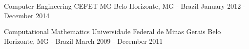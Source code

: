 

\begin{cventries}

  \cventry
    {Computer Engineering} %
    {CEFET MG} %
    {Belo Horizonte, MG - Brazil} %
    {January 2012 - December 2014} %
    {
      \begin{cvitems} %
      \end{cvitems}
    }

    \cventry
    {Computational Mathematics} %
    {Universidade Federal de Minas Gerais} %
    {Belo Horizonte, MG - Brazil} %
    {March 2009 - December 2011} %
    {
      \begin{cvitems} %
      \end{cvitems}
    }

\end{cventries}
